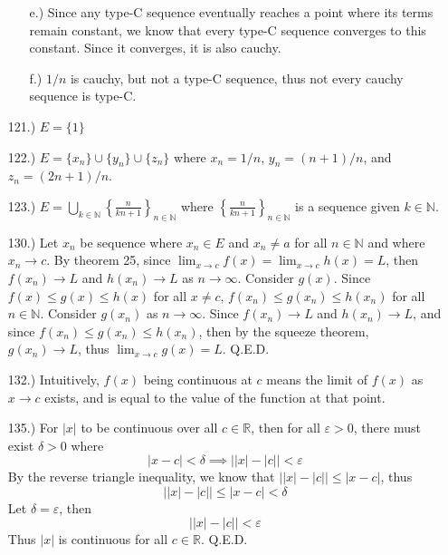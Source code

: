 \documentclass[12pt]{article}
\newcommand{\vertb}[1]{\left\vert#1\right\vert}
\newcommand{\e}{\varepsilon}
\newcommand{\lm}[1]{\displaystyle\lim_{#1}}
\begin{document}
\begin{itemize}
\begin{itemize}
        \item [e.)] Since any type-C sequence eventually reaches a point where its terms remain constant, we know that every type-C sequence converges to this constant. Since it converges, it is also cauchy.

        \item [f.)] $1/n$ is cauchy, but not a type-C sequence, thus not every cauchy sequence is type-C.
    \end{itemize}

    \item [121.)] $E=\{1\}$

    \item [122.)] $E=\{x_n\}\cup\{y_n\}\cup\{z_n\}$ where $x_n=1/n$, $y_n=(n+1)/n$, and $z_n=(2n+1)/n$.

    \item [123.)] $E=\displaystyle\bigcup_{k\in\mathbb{N}}\left\{\frac{n}{kn+1}\right\}_{n\in\mathbb{N}}$ where $\displaystyle\left\{\frac{n}{kn+1}\right\}_{n\in\mathbb{N}}$ is a sequence given $k\in\mathbb{N}$.

    \pagebreak
    \item [130.)] Let $x_n$ be sequence where $x_n\in E$ and $x_n\ne a$ for all $n\in\mathbb{N}$ and where $x_n\to c$. By theorem 25, since $\lm{x\to c}f(x)=\lm{x\to c}h(x)=L$, then $f(x_n)\to L$ and $h(x_n)\to L$ as $n\to\infty$. Consider $g(x)$. Since $f(x)\leq g(x)\leq h(x)$ for all $x\ne c$, $f(x_n)\leq g(x_n)\leq h(x_n)$ for all $n\in\mathbb{N}$. Consider $g(x_n)$ as $n\to\infty$. Since $f(x_n)\to L$ and $h(x_n)\to L$, and since $f(x_n)\leq g(x_n)\leq h(x_n)$, then by the squeeze theorem, $g(x_n)\to L$, thus $\lm{x\to c}g(x)=L$. Q.E.D.

    \item [132.)] Intuitively, $f(x)$ being continuous at $c$ means the limit of $f(x)$ as $x\to c$ exists, and is equal to the value of the function at that point.

    \item [135.)] For $\vertb{x}$ to be continuous over all $c\in\mathbb{R}$, then for all $\e>0$, there must exist $\delta>0$ where
    \[\vertb{x-c}<\delta\implies\big\vert{\vertb{x}-\vertb{c}}\big\vert<\e\]
    By the reverse triangle inequality, we know that $\big\vert{\vertb{x}-\vertb{c}}\big\vert\leq\vertb{x-c}$, thus
    \[\big\vert{\vertb{x}-\vertb{c}}\big\vert\leq\vertb{x-c}<\delta\]
    Let $\delta=\e$, then
    \[\big\vert{\vertb{x}-\vertb{c}}\big\vert<\e\]
    Thus $\vertb{x}$ is continuous for all $c\in\mathbb{R}$. Q.E.D.


\end{itemize}
\end{document}
